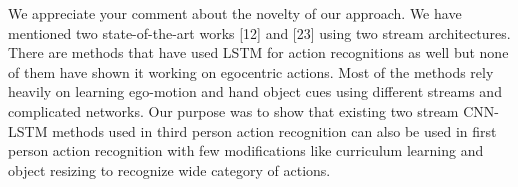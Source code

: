 \documentclass{article}
\begin{document}
\begin{enumerate}
We appreciate your comment about the novelty of our approach. We have mentioned two state-of-the-art works [12] and [23] using two stream architectures. There are methods that have used LSTM for action recognitions as well but none of them have shown it working on egocentric actions. Most of the methods rely heavily on learning ego-motion and hand object cues using different streams and complicated networks. Our purpose was to show that existing two stream CNN-LSTM methods used in third person action recognition can also be used in first person action recognition with few modifications like curriculum learning and object resizing to recognize wide category of actions.

\end{enumerate}
\end{document}
